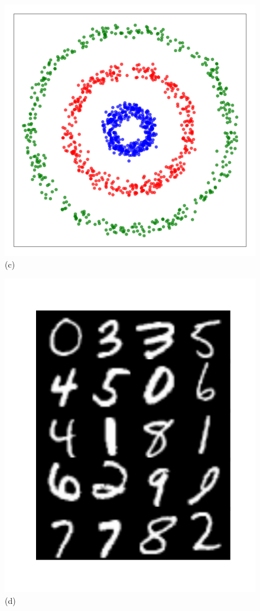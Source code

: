 \documentclass[aps,preprint,nofootinbib,floatfix]{revtex4-1}
\begin{document}
\begin{figure}
\begin{minipage}{0.24\textwidth}
\end{minipage}
\begin{minipage}{0.24\textwidth}
\includegraphics[width=1\textwidth]{3circles.pdf}\\[-1em] (c)  
\end{minipage}
\begin{minipage}{0.23\textwidth}
\vspace{-0.9em}
\includegraphics[width=1\textwidth]{mnist.pdf}\\[-1.8em] (d)  

\end{minipage}
\end{figure}
\end{document}
